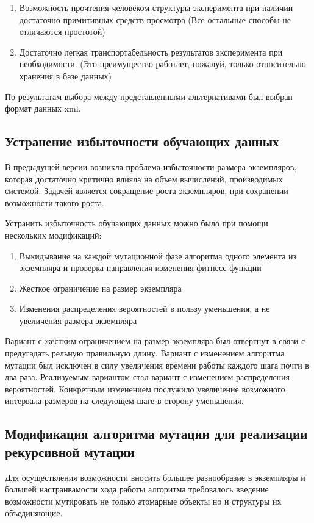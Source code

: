 \documentclass[utf8,usehyperref,12pt]{G7-32}
\begin{document}
\begin{enumerate}
\item Возможность прочтения человеком структуры эксперимента при наличии достаточно примитивных средств просмотра (Все остальные способы не отличаются простотой)
\item Достаточно легкая транспортабельность результатов эксперимента при необходимости. (Это преимущество работает, пожалуй, только относительно хранения в базе данных)
\end{enumerate}
По результатам выбора между представленными альтернативами был выбран формат данных xml.

\subsection{Устранение избыточности обучающих данных}
В предыдущей версии возникла проблема избыточности размера экземпляров, которая достаточно критично влияла на объем  вычислений, производимых системой. Задачей является сокращение роста экземпляров, при сохранении возможности такого роста.

Устранить избыточность обучающих данных можно было при помощи нескольких модификаций:
\begin{enumerate}
\item Выкидывание на каждой мутационной фазе алгоритма одного элемента из экземпляра и проверка направления изменения фитнесс-функции
\item Жесткое ограничение на размер экземпляра
\item Изменения распределения вероятностей в пользу уменьшения, а не увеличения размера экземпляра
\end{enumerate}
Вариант с жестким ограничением на размер экземпляра был отвергнут в связи с предугадать рельную правильную длину. Вариант с изменением алгоритма мутации был исключен в силу увеличения времени работы каждого шага почти в два раза. Реализуемым вариантом стал вариант с изменением распределения вероятностей. Конкретным изменением послужило увеличение возможного интервала размеров на следующем шаге в сторону уменьшения.

\subsection{Модификация алгоритма мутации для реализации рекурсивной мутации}
Для осуществления возможности вносить большее разнообразие в экземпляры и большей настраивамости хода работы алгоритма требовалось введение возможности мутировать не только атомарные объекты но и структуры их объединяющие.
\end{document}
